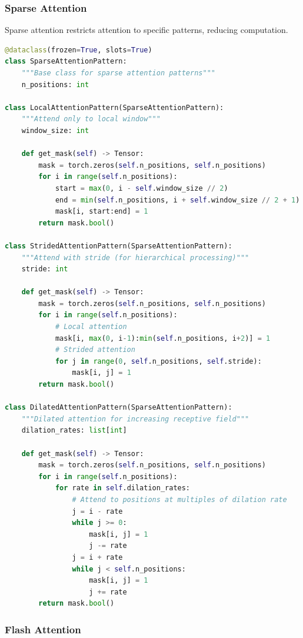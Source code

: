 \subsubsection{Sparse Attention}

Sparse attention restricts attention to specific patterns, reducing computation.

\begin{lstlisting}[language=Python, caption=Sparse Attention Patterns]
@dataclass(frozen=True, slots=True)
class SparseAttentionPattern:
    """Base class for sparse attention patterns"""
    n_positions: int

class LocalAttentionPattern(SparseAttentionPattern):
    """Attend only to local window"""
    window_size: int

    def get_mask(self) -> Tensor:
        mask = torch.zeros(self.n_positions, self.n_positions)
        for i in range(self.n_positions):
            start = max(0, i - self.window_size // 2)
            end = min(self.n_positions, i + self.window_size // 2 + 1)
            mask[i, start:end] = 1
        return mask.bool()

class StridedAttentionPattern(SparseAttentionPattern):
    """Attend with stride (for hierarchical processing)"""
    stride: int

    def get_mask(self) -> Tensor:
        mask = torch.zeros(self.n_positions, self.n_positions)
        for i in range(self.n_positions):
            # Local attention
            mask[i, max(0, i-1):min(self.n_positions, i+2)] = 1
            # Strided attention
            for j in range(0, self.n_positions, self.stride):
                mask[i, j] = 1
        return mask.bool()

class DilatedAttentionPattern(SparseAttentionPattern):
    """Dilated attention for increasing receptive field"""
    dilation_rates: list[int]

    def get_mask(self) -> Tensor:
        mask = torch.zeros(self.n_positions, self.n_positions)
        for i in range(self.n_positions):
            for rate in self.dilation_rates:
                # Attend to positions at multiples of dilation rate
                j = i - rate
                while j >= 0:
                    mask[i, j] = 1
                    j -= rate
                j = i + rate
                while j < self.n_positions:
                    mask[i, j] = 1
                    j += rate
        return mask.bool()
\end{lstlisting}

\subsubsection{Flash Attention}

